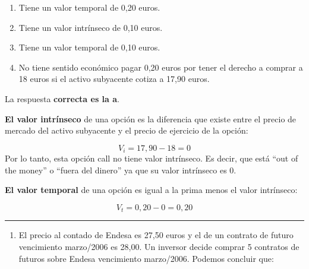 \documentclass[
  letterpaper,
  DIV=11,
  numbers=noendperiod]{scrreprt}
\providecommand{\tightlist}{%
  \setlength{\itemsep}{0pt}\setlength{\parskip}{0pt}}\usepackage{longtable,booktabs,array}
\begin{document}
\begin{enumerate}
\def\labelenumi{\alph{enumi})}
\item
  Tiene un valor temporal de 0,20 euros.
\item
  Tiene un valor intrínseco de 0,10 euros.
\item
  Tiene un valor temporal de 0,10 euros.
\item
  No tiene sentido económico pagar 0,20 euros por tener el derecho a
  comprar a 18 euros si el activo subyacente cotiza a 17,90 euros.
\end{enumerate}

\begin{tcolorbox}[enhanced jigsaw, left=2mm, opacityback=0, colback=white, breakable, arc=.35mm, bottomrule=.15mm, rightrule=.15mm, toprule=.15mm, leftrule=.75mm, colframe=quarto-callout-tip-color-frame]
\begin{minipage}[t]{5.5mm}
\textcolor{quarto-callout-tip-color}{\faLightbulb}
\end{minipage}%
\begin{minipage}[t]{\textwidth - 5.5mm}

La respuesta \textbf{correcta es la a}.

\textbf{El valor intrínseco} de una opción es la diferencia que existe
entre el precio de mercado del activo subyacente y el precio de
ejercicio de la opción:

\[V_i=17,90-18=0\] Por lo tanto, esta opción call no tiene valor
intrínseco. Es decir, que está ``out of the money'' o ``fuera del
dinero'' ya que su valor intrínseco es 0.

\textbf{El valor temporal} de una opción es igual a la prima menos el
valor intrínseco:

\[V_t=0,20-0=0,20\]

\end{minipage}%
\end{tcolorbox}

\begin{center}\rule{0.5\linewidth}{0.5pt}\end{center}

\begin{enumerate}
\def\labelenumi{\arabic{enumi}.}
\setcounter{enumi}{29}
\tightlist
\item
  El precio al contado de Endesa es 27,50 euros y el de un contrato de
  futuro vencimiento marzo/2006 es 28,00. Un inversor decide comprar 5
  contratos de futuros sobre Endesa vencimiento marzo/2006. Podemos
  concluir que:
\end{enumerate}
\end{document}
